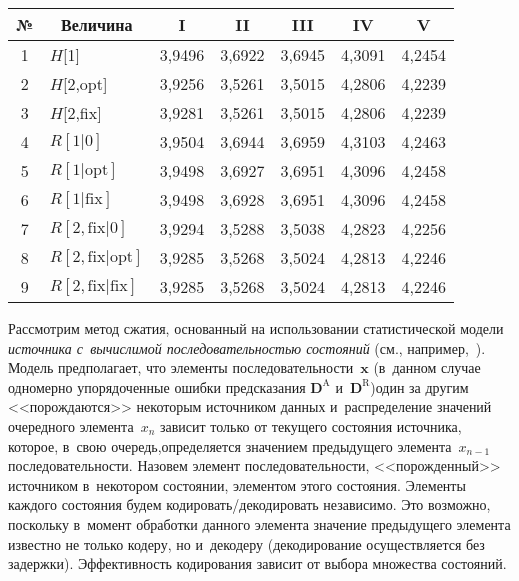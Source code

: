\begin{multicols}{2}
\begin{table*}\small %
\begin{center}
\label{tab1}
\vspace{2ex}

\begin{tabular}{|c|l|c|c|c|c|c|}
\hline
№   & \multicolumn{1}{c|}{Величина}  & I          & II         & III        &   IV      & V \\
\hline
1   & $H$[1]      & 3,9496    & 3,6922    & 3,6945    & 4,3091    & 4,2454  \\
2   & $H$[2,opt]                    & 3,9256  & 3,5261  & 3,5015    & 4,2806    & 4,2239 \\
3   & $H$[2,fix]                            & 3,9281    & 3,5261    & 3,5015    & 4,2806    & 4,2239 \\
\hline
4   & $R[1\vert 0]$  & 3,9504    & 3,6944    & 3,6959    & 4,3103    & 4,2463 \\
5   & $R[1\vert \mathrm{opt}]$                    & 3,9498    & 3,6927    & 3,6951    & 4,3096    & 4,2458 \\
6   & $R[1\vert \mathrm{fix}]$                            & 3,9498    & 3,6928    & 3,6951    & 4,3096    & 4,2458 \\
7   & $R[2,\mathrm{fix}\vert 0] $                     & 3,9294    & 3,5288    & 3,5038    & 4,2823    & 4,2256 \\
8   & $R[2,\mathrm{fix}\vert \mathrm{opt}]$                & 3,9285    & 3,5268 & 3,5024   & 4,2813    & 4,2246 \\
9   & $R[2,\mathrm{fix}\vert \mathrm{fix}]$                    & 3,9285    & 3,5268 & 3,5024   & 4,2813    & 4,2246 \\
\hline
\end{tabular}
\end{center}
\end{table*}

Рассмотрим метод сжатия, основанный на использовании статистической модели 
\textit{источника с~вычислимой последовательностью состояний} (см., например,~\cite{b4}). 
Модель предполагает, что элементы последовательности~$\mathbf{x}$ 
(в~данном случае одномерно упорядоченные ошибки предсказания $\mathbf{D}^\text{A}$ 
и~$\mathbf{D}^\text{R}$)\linebreak один за другим <<порождаются>> некоторым источником данных и~распределение 
значений очередного элемента~$x_n$ зависит только от текущего со\-сто\-яния источника, 
которое, в~свою очередь,\linebreak \mbox{определяется} значением предыдущего элемента~$x_{n-1}$  
последовательности. Назовем элемент последовательности, <<порожденный>> источником в~некотором 
состоянии, элементом этого состояния. Элементы каждого состояния будем ко\-ди\-ро\-вать/де\-ко\-ди\-ро\-вать независимо. 
Это возможно, поскольку в~момент обработки данного элемента значение предыдущего элемента известно не только 
кодеру, но и~декодеру (декодирование осуществляется без задержки). Эффективность кодирования 
зависит от выбора множества состояний.


\end{multicols}
